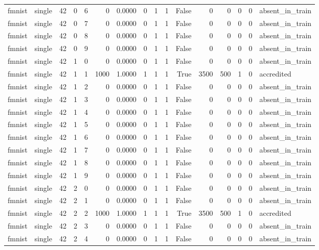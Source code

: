 \begin{tabular}{llrrrrrrrrrrrrrl}
fmnist & single & 42 & 0 & 6 & 0 & 0.0000 & 0 & 1 & 1 & False & 0 & 0 & 0 & 0 & absent\_in\_train \\
fmnist & single & 42 & 0 & 7 & 0 & 0.0000 & 0 & 1 & 1 & False & 0 & 0 & 0 & 0 & absent\_in\_train \\
fmnist & single & 42 & 0 & 8 & 0 & 0.0000 & 0 & 1 & 1 & False & 0 & 0 & 0 & 0 & absent\_in\_train \\
fmnist & single & 42 & 0 & 9 & 0 & 0.0000 & 0 & 1 & 1 & False & 0 & 0 & 0 & 0 & absent\_in\_train \\
fmnist & single & 42 & 1 & 0 & 0 & 0.0000 & 0 & 1 & 1 & False & 0 & 0 & 0 & 0 & absent\_in\_train \\
fmnist & single & 42 & 1 & 1 & 1000 & 1.0000 & 1 & 1 & 1 & True & 3500 & 500 & 1 & 0 & accredited \\
fmnist & single & 42 & 1 & 2 & 0 & 0.0000 & 0 & 1 & 1 & False & 0 & 0 & 0 & 0 & absent\_in\_train \\
fmnist & single & 42 & 1 & 3 & 0 & 0.0000 & 0 & 1 & 1 & False & 0 & 0 & 0 & 0 & absent\_in\_train \\
fmnist & single & 42 & 1 & 4 & 0 & 0.0000 & 0 & 1 & 1 & False & 0 & 0 & 0 & 0 & absent\_in\_train \\
fmnist & single & 42 & 1 & 5 & 0 & 0.0000 & 0 & 1 & 1 & False & 0 & 0 & 0 & 0 & absent\_in\_train \\
fmnist & single & 42 & 1 & 6 & 0 & 0.0000 & 0 & 1 & 1 & False & 0 & 0 & 0 & 0 & absent\_in\_train \\
fmnist & single & 42 & 1 & 7 & 0 & 0.0000 & 0 & 1 & 1 & False & 0 & 0 & 0 & 0 & absent\_in\_train \\
fmnist & single & 42 & 1 & 8 & 0 & 0.0000 & 0 & 1 & 1 & False & 0 & 0 & 0 & 0 & absent\_in\_train \\
fmnist & single & 42 & 1 & 9 & 0 & 0.0000 & 0 & 1 & 1 & False & 0 & 0 & 0 & 0 & absent\_in\_train \\
fmnist & single & 42 & 2 & 0 & 0 & 0.0000 & 0 & 1 & 1 & False & 0 & 0 & 0 & 0 & absent\_in\_train \\
fmnist & single & 42 & 2 & 1 & 0 & 0.0000 & 0 & 1 & 1 & False & 0 & 0 & 0 & 0 & absent\_in\_train \\
fmnist & single & 42 & 2 & 2 & 1000 & 1.0000 & 1 & 1 & 1 & True & 3500 & 500 & 1 & 0 & accredited \\
fmnist & single & 42 & 2 & 3 & 0 & 0.0000 & 0 & 1 & 1 & False & 0 & 0 & 0 & 0 & absent\_in\_train \\
fmnist & single & 42 & 2 & 4 & 0 & 0.0000 & 0 & 1 & 1 & False & 0 & 0 & 0 & 0 & absent\_in\_train \\

\end{tabular}
